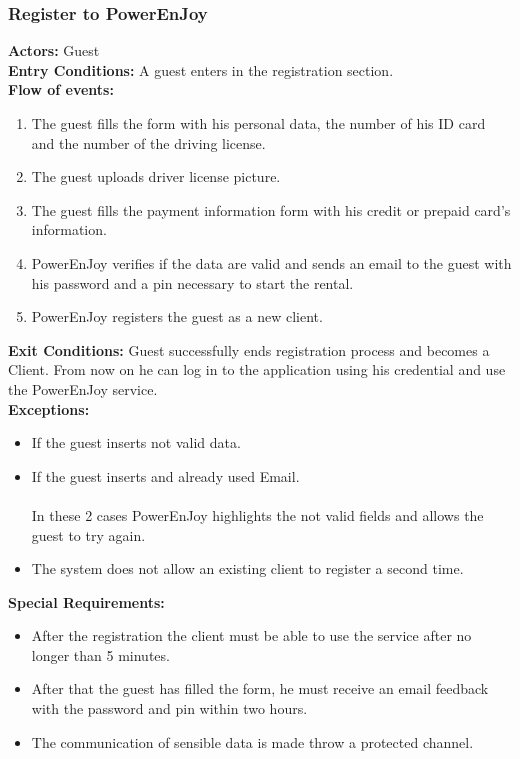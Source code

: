 \subsubsection{Register to PowerEnJoy}
%
\textbf{Actors:}
Guest\\
%
\textbf{Entry Conditions:}
A guest enters in the registration section.\\ 
%
\textbf{Flow of events:}
\begin{enumerate}
\item The guest fills the form with his personal data, the number of his ID card and the number of the driving license. 
\item The guest uploads driver license picture.
\item  The guest fills the payment information form with his credit or prepaid card's information. 
\item PowerEnJoy verifies if the data are valid and sends an email to the guest with his password and a pin necessary to start the rental. 
\item PowerEnJoy registers the guest as a new client. 
\end{enumerate}
%
\textbf{Exit Conditions:}
Guest successfully ends registration process and becomes a Client. From now on he can log in to the application using his credential and use the PowerEnJoy service. \\ 
%
\textbf{Exceptions:}
\begin{itemize}
\item If the guest inserts not valid data.
\item If the guest inserts and already used Email.
\\
\\In these 2 cases PowerEnJoy highlights the not valid fields and allows the guest to try again.
\item The system does not allow an existing client to register a second time.
\end{itemize}
%
\textbf{Special Requirements:}
\begin{itemize}
\item After the registration the client must be able to use the service after no longer than 5 minutes.
\item After that the guest has filled the form, he must receive an email feedback with the password and pin within two hours.
\item The communication of sensible data is made throw a protected channel.
\end{itemize}


